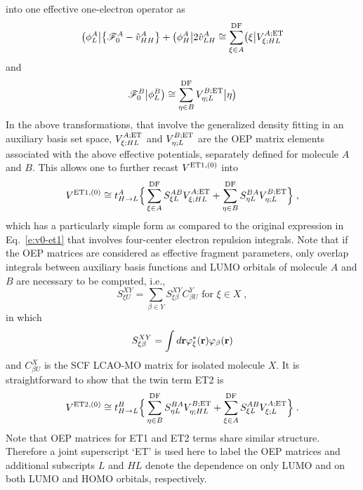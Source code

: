 into one effective one\hyp{}electron operator
as
%
\begin{equation}
 \bigl( {\phi_L^A} \bigl\lvert \left\{ \mathscr{F}_0^A - \hat{v}^A_{HH} \right\}
 + \bigl( {\phi_H^A} \bigl\lvert 2 \hat{v}^A_{LH} 
 \cong \sum_{\xi\in A}^{\rm DF} \bigl( {\xi} \bigl\lvert V^{A;{\rm ET}}_{\xi;HL}
\end{equation}
%
and
%
\begin{equation}
 \mathscr{F}_0^B \bigr\rvert {\phi_L^B} \bigr) \cong \sum_{\eta\in B}^{\rm DF} V^{B;{\rm ET}}_{\eta;L} \bigr\rvert {\eta} \bigr) 
\end{equation}
%
In the above transformations, that involve the generalized density fitting
in an auxiliary basis set space,
$V^{A;{\rm ET}}_{\xi;HL}$ and $V^{B;{\rm ET}}_{\eta;L}$
are the OEP matrix elements associated with the above
effective potentials, separately defined for molecule $A$ and $B$. This allows one to
further recast $V^{{\rm ET1},(0)}$ into
%
\begin{multline}\label{e:v0-et1-oep}
 V^{{\rm ET1},(0)} \cong t_{H\rightarrow L}^A \Big\{ 
 \sum_{\xi\in A}^{\rm DF} S_{\xi L}^{AB} V^{A;{\rm ET}}_{\xi;HL} +
 \sum_{\eta\in B}^{\rm DF} S_{\eta L}^{BA} V^{B;{\rm ET}}_{\eta;L}
 \Big\} \;,
\end{multline}
%
which has a particularly simple form as compared to the original expression
in Eq.~\eqref{e:v0-et1} that involves four\hyp{}center electron repulsion integrals.
Note that if 
the OEP matrices are considered
as effective fragment parameters, %
only overlap integrals between auxiliary basis functions and LUMO orbitals of molecule
$A$ and $B$ are necessary to be computed, i.e.,
%
\begin{equation}
 S^{XY}_{\xi U} = \sum_{\beta\in Y} S_{\xi\beta}^{XY} C_{\beta U}^Y \text{ for $\xi\in X$} \;,
\end{equation}
%
in which 
%
\begin{equation}
 S_{\xi\beta}^{XY} = \int d{\bf r} \varphi_\xi^*({\bf r}) \varphi_\beta({\bf r})
\end{equation}
%
and $C_{\beta U}^X$ is the SCF LCAO-MO matrix for isolated molecule $X$.
It is straightforward to show that the twin term ET2 is
%
\begin{multline}\label{e:v0-et2-oep}
 V^{{\rm ET2},(0)} \cong t_{H\rightarrow L}^B \Big\{ 
 \sum_{\eta\in B}^{\rm DF} S_{\eta L}^{BA} V^{B;{\rm ET}}_{\eta;HL} +
 \sum_{\xi\in A}^{\rm DF} S_{\xi L}^{AB} V^{A;{\rm ET}}_{\xi;L}
 \Big\} \;.
\end{multline}
%
Note that OEP matrices for ET1 and ET2 terms share similar structure.
Therefore a joint superscript `ET' is used here to label the OEP matrices
and additional subscripts
$L$ and $HL$ denote the dependence on only LUMO and on both LUMO and HOMO orbitals, respectively.

